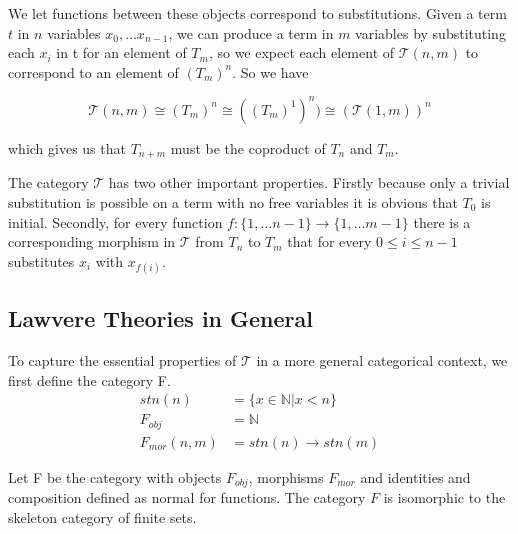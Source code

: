\documentclass[12pt,a4paper,twoside,openright]{report}
\begin{document}
We let functions between these objects correspond to substitutions. Given a term
$t$ in $n$ variables $x_0,\ldots x_{n-1}$, we can produce a term in $m$
variables by substituting each $x_i$ in t for an element of $T_m$, so we expect
each element of $\mathcal{T}(n, m)$ to correspond to an element of $(T_m)^n$. So
we have

\[\mathcal{T}(n,m)\cong (T_m)^n\cong ((T_m)^1)^n)\cong (\mathcal{T}(1, m))^n\]

which gives us that $T_{n+m}$ must be the coproduct of $T_n$ and
$T_m$.

The category $\mathcal{T}$ has two other important properties. Firstly because
only a trivial substitution is possible on a term with no free variables it is
obvious that $T_0$ is initial. Secondly, for every function $f: \{1,\ldots n-1\}
\rightarrow \{1,\ldots m-1\}$ there is a corresponding morphism in $\mathcal{T}$
from $T_n$ to $T_m$ that for every $0\leq i\leq n-1$ substitutes $x_i$ with
$x_{f(i)}$.

\subsection{Lawvere Theories in General}
To capture the essential properties of $\mathcal{T}$ in a more general
categorical context, we first define the category F.
\begin{align*}
    stn(n) &= \{x\in \mathbb{N} | x < n\} \\
    F_{obj} &= \mathbb{N} \\
    F_{mor}(n, m) &= stn(n)\to stn(m)
\end{align*}

Let F be the category with objects $F_{obj}$, morphisms $F_{mor}$ and identities
and composition defined as normal for functions. The category $F$ is isomorphic
to the skeleton category of finite sets.
\end{document}

